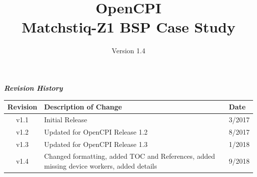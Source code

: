 \def\docTitle{OpenCPI\\ Matchstiq-Z1 BSP Case Study}
\def\docVersion{1.4}

\date{Version \docVersion} %
\title{\docTitle}
\usepackage[T1]{fontenc} %
\usepackage{graphicx}
\graphicspath{ {figures/} }
\usepackage{textcomp}

\maketitle
\newpage

	\begin{center}
	\textit{\textbf{Revision History}}
		\begin{table}[H]
		\label{table:revisions} %
			\begin{tabularx}{\textwidth}{|c|X|l|}
			\hline
			\rowcolor{blue}
			\textbf{Revision} & \textbf{Description of Change} & \textbf{Date} \\
		    \hline
		    v1.1 & Initial Release & 3/2017 \\
		    \hline
		    v1.2 & Updated for OpenCPI Release 1.2 & 8/2017 \\
			\hline
			v1.3 & Updated for OpenCPI Release 1.3 & 1/2018 \\
			\hline
			v1.4 & Changed formatting, added TOC and References, added missing device workers, added details & 9/2018 \\
			\hline
			\end{tabularx}
		\end{table}
	\end{center}

